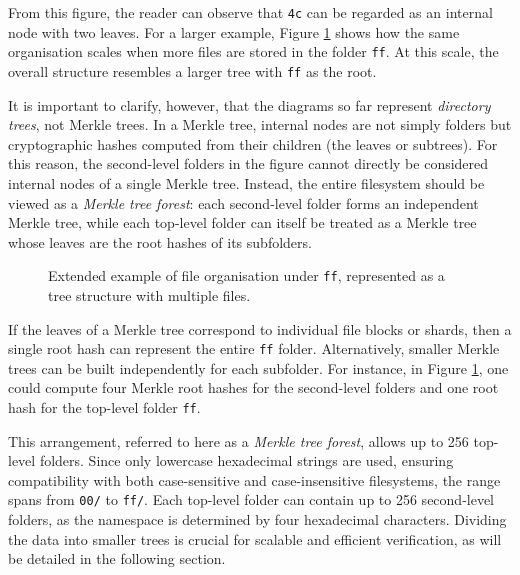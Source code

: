 From this figure, the reader can observe that \texttt{4c} can be regarded as an internal node with two leaves. For a larger example, Figure \ref{fig:file-organisation-example-in-tree-2} shows how the same organisation scales when more files are stored in the folder \texttt{ff}. At this scale, the overall structure resembles a larger tree with \texttt{ff} as the root.  

It is important to clarify, however, that the diagrams so far represent \emph{directory trees}, not Merkle trees. In a Merkle tree, internal nodes are not simply folders but cryptographic hashes computed from their children (the leaves or subtrees). For this reason, the second-level folders in the figure cannot directly be considered internal nodes of a single Merkle tree. Instead, the entire filesystem should be viewed as a \emph{Merkle tree forest}: each second-level folder forms an independent Merkle tree, while each top-level folder can itself be treated as a Merkle tree whose leaves are the root hashes of its subfolders.

\begin{figure}[h]
\centering
{}
\caption{Extended example of file organisation under \texttt{ff}, represented as a tree structure with multiple files.}
\label{fig:file-organisation-example-in-tree-2}
\end{figure}

If the leaves of a Merkle tree correspond to individual file blocks or shards, then a single root hash can represent the entire \texttt{ff} folder. Alternatively, smaller Merkle trees can be built independently for each subfolder. For instance, in Figure \ref{fig:file-organisation-example-in-tree-2}, one could compute four Merkle root hashes for the second-level folders and one root hash for the top-level folder \texttt{ff}.

This arrangement, referred to here as a \emph{Merkle tree forest}, allows up to 256 top-level folders. Since only lowercase hexadecimal strings are used, ensuring compatibility with both case-sensitive and case-insensitive filesystems, the range spans from \texttt{00/} to \texttt{ff/}. Each top-level folder can contain up to 256 second-level folders, as the namespace is determined by four hexadecimal characters. Dividing the data into smaller trees is crucial for scalable and efficient verification, as will be detailed in the following section.

